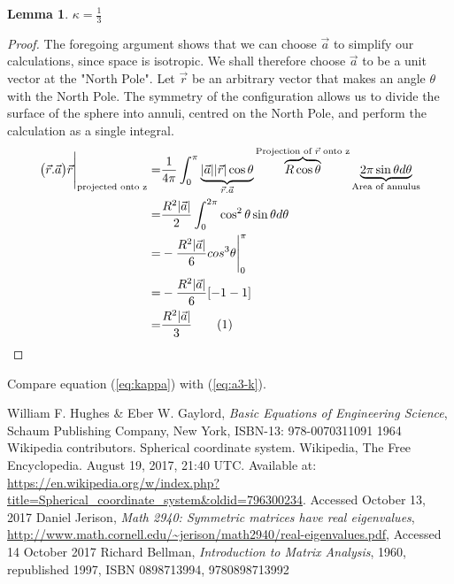 \documentclass[]{article}
\newcommand\numberthis{\addtocounter{equation}{1}\tag{\theequation}}
\newtheorem{lemma}{Lemma}
\begin{document}
\begin{lemma}
	$\kappa=\frac{1}{3}$
\end{lemma}
\begin{proof}
	The foregoing argument shows that we can choose $\vec{a}$ to simplify our calculations, since space is isotropic. We shall therefore choose $\vec{a}$ to be a unit vector at the "North Pole". Let $\vec{r}$ be an arbitrary vector that makes an angle $\theta$ with the North Pole. The symmetry of the configuration allows us to divide the surface of the sphere into annuli, centred on the North Pole, and perform the calculation as a single integral.
	\begin{align*}
	\big(\vec{r}.\vec{a}\big)\vec{r}\Bigg|_\text{projected onto z}=&\frac{1}{4\pi}\int_{0}^{\pi}\underbrace{|\vec{a}||\vec{r}|\cos\theta}_{\vec{r}.\vec{a}}\overbrace{R \cos \theta}^{\text{Projection of $\vec{r}$ onto z}}\underbrace{2\pi \sin\theta d\theta}_\text{Area of annulus}\\
	=& \frac{R^2|\vec{a}|}{2}\int_{0}^{2\pi}\cos^2 \theta \sin \theta d \theta\\
	=& - \frac{R^2|\vec{a}|}{6} cos^3\theta\Bigg |_0^{\pi}\\
	=& - \frac{R^2|\vec{a}|}{6} [-1-1]\\
	=& \frac{R^2|\vec{a}|}{3} \numberthis \label{eq:kappa}
	\end{align*}
\end{proof}
Compare equation (\ref{eq:kappa}) with (\ref{eq:a3-k}).
 
\begin{thebibliography}{9}\label{section:biblio}
	\raggedright
	William F. Hughes \& Eber W. Gaylord,
	\emph{Basic Equations of Engineering Science},
	Schaum Publishing Company, New York,
	ISBN-13: 978-0070311091
	1964
	Wikipedia contributors. Spherical coordinate system. Wikipedia, The Free Encyclopedia. August 19, 2017, 21:40 UTC. Available at: 
	\url{https://en.wikipedia.org/w/index.php?title=Spherical_coordinate_system&oldid=796300234}.
	Accessed
	October 13, 2017
	Daniel Jerison,
	\emph{Math 2940: Symmetric matrices have real eigenvalues},
	\url{http://www.math.cornell.edu/~jerison/math2940/real-eigenvalues.pdf},
	Accessed 14 October 2017
	Richard Bellman,
	\emph{Introduction to Matrix Analysis},
	1960, republished 1997,
	ISBN	0898713994, 9780898713992
\end{thebibliography}
\end{document}
